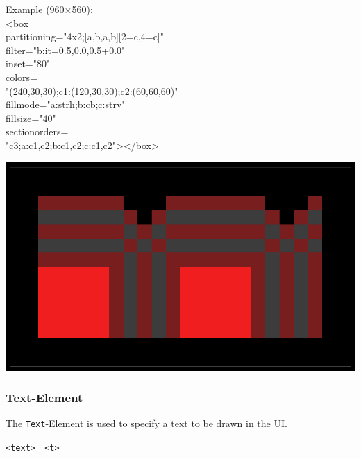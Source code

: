 \documentclass[a4paper,11pt]{article}
\begin{document}
\begin{minipage}{0.35\linewidth}
Example (960×560):\\
    <box\\partitioning="4x2;[a,b,a,b][2=c,4=c]"\\filter="b:it=0.5,0.0,0.5+0.0"\\inset="80"\\colors=\\"(240,30,30);c1:(120,30,30);c2:(60,60,60)"\\fillmode="a:strh;b:cb;c:strv"\\fillsize="40"\\sectionorders=\\"c3;a:c1,c2;b:c1,c2;c:c1,c2"></box>
\end{minipage}
\hfill
\begin{minipage}{0.55\linewidth}
\includegraphics[width=\linewidth]{images/box.png}
\end{minipage}


\newpage
\hypertarget{text}{}
\subsubsection*{Text-Element}
The \texttt{Text}-Element is used to specify a text to be drawn in the UI.
\begin{center}
    \texttt{<text>} | \texttt{<t>}
\end{center}
\end{document}
